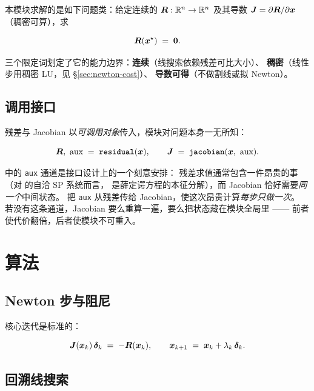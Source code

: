 本模块求解的是如下问题类：给定连续的 $\bm{R}:\mathbb{R}^{n}\to\mathbb{R}^{n}$
及其导数 $\bm{J}=\partial\bm{R}/\partial\bm{x}$（稠密可算），求

\begin{equation}
\bm{R}(\bm{x}^{\star}) \;=\; \bm{0}.
\label{eq:newton-problem}
\end{equation}

三个限定词划定了它的能力边界：\textbf{连续}（线搜索依赖残差可比大小）、
\textbf{稠密}（线性步用稠密 LU，见 \S\ref{sec:newton-cost}）、
\textbf{导数可得}（不做割线或拟 Newton）。

\subsection{调用接口}

残差与 Jacobian 以\emph{可调用对象}传入，模块对问题本身一无所知：

\begin{equation}
\bm{R},\ \text{aux} \;=\; \texttt{residual}(\bm{x}),
\qquad
\bm{J} \;=\; \texttt{jacobian}(\bm{x},\ \text{aux}).
\label{eq:newton-callbacks}
\end{equation}

 中的 \texttt{aux} 通道是接口设计上的一个刻意安排：
残差求值通常包含一件昂贵的事（对  的自洽 SP 系统而言，
是薛定谔方程的本征分解），而 Jacobian 恰好需要\emph{同一个}中间状态。
把 \texttt{aux} 从残差传给 Jacobian，使这次昂贵计算\emph{每步只做一次}。
若没有这条通道，Jacobian 要么重算一遍，要么把状态藏在模块全局里 ——
前者使代价翻倍，后者使模块不可重入。

\section{算法}
\label{sec:newton-algorithm}

\subsection{Newton 步与阻尼}
\label{sec:newton-step}

核心迭代是标准的：

\begin{equation}
\bm{J}(\bm{x}_k)\,\bm{\delta}_k \;=\; -\bm{R}(\bm{x}_k),
\qquad
\bm{x}_{k+1} \;=\; \bm{x}_k + \lambda_k\,\bm{\delta}_k .
\label{eq:newton-iteration}
\end{equation}

\subsection{回溯线搜索}
\label{sec:newton-line-search}

